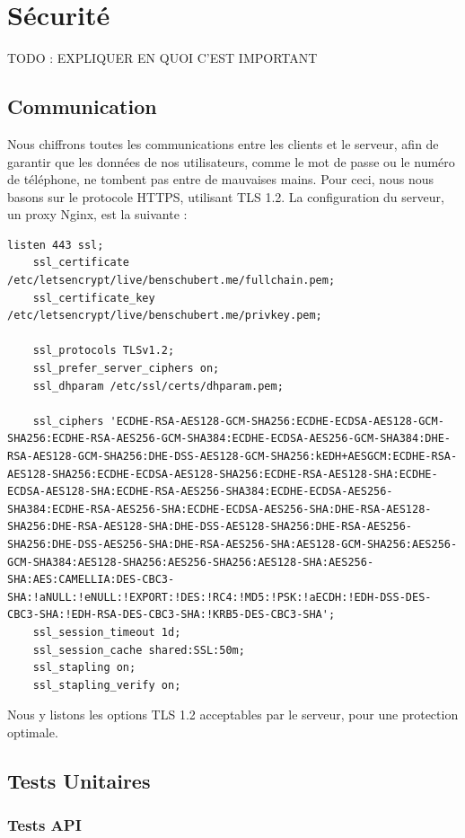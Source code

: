 \documentclass[french]{article}
\begin{document}
	\section{Sécurité}
	
	TODO : EXPLIQUER EN QUOI C'EST IMPORTANT
	
	\subsection{Communication}
	
	Nous chiffrons toutes les communications entre les clients et le serveur, afin de garantir que les données de nos utilisateurs, comme le mot de passe ou le numéro de téléphone, ne tombent pas entre de mauvaises mains. Pour ceci, nous nous basons sur le protocole HTTPS, utilisant TLS 1.2. La configuration du serveur, un proxy Nginx, est la suivante :
	
	\begin{lstlisting}[style=py]
	listen 443 ssl;
	ssl_certificate /etc/letsencrypt/live/benschubert.me/fullchain.pem;
	ssl_certificate_key /etc/letsencrypt/live/benschubert.me/privkey.pem;
	
	ssl_protocols TLSv1.2;
	ssl_prefer_server_ciphers on;
	ssl_dhparam /etc/ssl/certs/dhparam.pem;
	
	ssl_ciphers 'ECDHE-RSA-AES128-GCM-SHA256:ECDHE-ECDSA-AES128-GCM-SHA256:ECDHE-RSA-AES256-GCM-SHA384:ECDHE-ECDSA-AES256-GCM-SHA384:DHE-RSA-AES128-GCM-SHA256:DHE-DSS-AES128-GCM-SHA256:kEDH+AESGCM:ECDHE-RSA-AES128-SHA256:ECDHE-ECDSA-AES128-SHA256:ECDHE-RSA-AES128-SHA:ECDHE-ECDSA-AES128-SHA:ECDHE-RSA-AES256-SHA384:ECDHE-ECDSA-AES256-SHA384:ECDHE-RSA-AES256-SHA:ECDHE-ECDSA-AES256-SHA:DHE-RSA-AES128-SHA256:DHE-RSA-AES128-SHA:DHE-DSS-AES128-SHA256:DHE-RSA-AES256-SHA256:DHE-DSS-AES256-SHA:DHE-RSA-AES256-SHA:AES128-GCM-SHA256:AES256-GCM-SHA384:AES128-SHA256:AES256-SHA256:AES128-SHA:AES256-SHA:AES:CAMELLIA:DES-CBC3-SHA:!aNULL:!eNULL:!EXPORT:!DES:!RC4:!MD5:!PSK:!aECDH:!EDH-DSS-DES-CBC3-SHA:!EDH-RSA-DES-CBC3-SHA:!KRB5-DES-CBC3-SHA';
	ssl_session_timeout 1d;
	ssl_session_cache shared:SSL:50m;
	ssl_stapling on;
	ssl_stapling_verify on;
	\end{lstlisting}
	
	Nous y listons les options TLS 1.2 acceptables par le serveur, pour une protection optimale.
	
	\subsection{Tests Unitaires}
	\subsubsection{Tests API}
	
\end{document}
